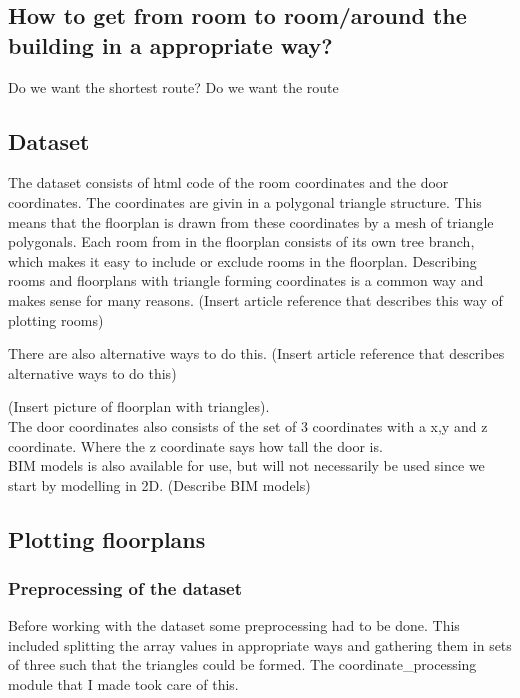 \subsection{How to get from room to room/around the building in a appropriate way?}
Do we want the shortest route?
Do we want the route


\subsection{Dataset}
The dataset consists of html code of the room coordinates and the door coordinates. The coordinates are givin in a polygonal triangle structure. This means that the floorplan is drawn from these coordinates by a mesh of triangle polygonals. Each room from in the floorplan consists of its own tree branch, which makes it easy to include or exclude rooms in the floorplan. 
Describing rooms and floorplans with triangle forming coordinates is a common way and makes sense for many reasons.
(Insert article reference that describes this way of plotting rooms)

There are also alternative ways to do this. 
(Insert article reference that describes alternative ways to do this)


(Insert picture of floorplan with triangles).
\\
The door coordinates also consists of the set of 3 coordinates with a x,y and z coordinate. Where the z coordinate says how tall the door is. 
\\
BIM models is also available for use, but will not necessarily be used since we start by modelling in 2D.
(Describe BIM models)

\subsection{Plotting floorplans}
\subsubsection{Preprocessing of the dataset}
Before working with the dataset some preprocessing had to be done. This included splitting the array values in appropriate ways and gathering them in sets of three such that the triangles could be formed. The coordinate_processing module that I made took care of this.

